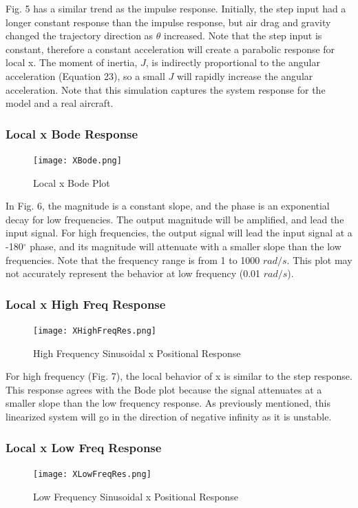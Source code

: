 \documentclass[conference]{IEEEtran}
\begin{document}
Fig. 5 has a similar trend as the impulse response. Initially, the step input had a longer constant response than the impulse response, but air drag and gravity changed the trajectory direction as $\theta$ increased. Note that the step input is constant, therefore a constant acceleration will create a parabolic response for local x. The moment of inertia, $J$, is indirectly proportional to the angular acceleration (Equation 23), so a small $J$ will rapidly increase the angular acceleration. Note that this simulation captures the system response for the model and a real aircraft.  

\subsubsection{Local x Bode Response} 
\begin{figure}[htbp]
\centerline{\texttt{[image: XBode.png]}}
\caption{Local x Bode Plot}
\label{figure}
\end{figure}

In Fig. 6, the magnitude is a constant slope, and the phase is an exponential decay for low frequencies. The output magnitude will be amplified, and lead the input signal. For high frequencies, the output signal will lead the input signal at a -180$^{\circ}$ phase, and its magnitude will attenuate with a smaller slope than the low frequencies. Note that the frequency range is from 1 to 1000 $rad/s$. This plot may not accurately represent the behavior at low frequency (0.01 $rad/s$).


\newpage
\subsubsection{Local x High Freq Response}
\begin{figure}[htbp]
\centering
\centerline{\texttt{[image: XHighFreqRes.png]}}
\caption{High Frequency Sinusoidal x Positional Response}
\label{figure}
\end{figure}

For high frequency (Fig. 7), the local behavior of x is similar to the step response. This response agrees with the Bode plot because the signal attenuates at a smaller slope than the low frequency response. As previously mentioned, this linearized system will go in the direction of negative infinity as it is unstable. \\

\subsubsection{Local x Low Freq Response} 
\begin{figure}[htbp]
\centerline{\texttt{[image: XLowFreqRes.png]}}
\caption{Low Frequency Sinusoidal x Positional Response}
\label{figure}
\end{figure}
\end{document}
